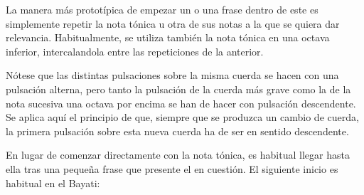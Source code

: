 La manera más prototípica de empezar un \taqsim o una frase dentro de este es simplemente repetir la nota tónica u otra de sus notas a la que se quiera dar relevancia. Habitualmente, se utiliza también la nota tónica en una octava inferior, intercalandola entre las repeticiones de la anterior.

\begin{center}
\end{center}


Nótese que las distintas pulsaciones sobre la misma cuerda se hacen con una pulsación alterna, pero tanto la pulsación de la cuerda más grave como la de la nota sucesiva una octava por encima se han de hacer con pulsación descendente. Se aplica aquí el principio de que, siempre que se produzca un cambio de cuerda, la primera pulsación sobre esta nueva cuerda ha de ser en sentido descendente.

En lugar de comenzar directamente con la nota tónica, es habitual llegar hasta ella tras una pequeña frase que presente el \yins en cuestión. El siguiente inicio es habitual en el \maqam Bayati:

\begin{center}
\end{center}

